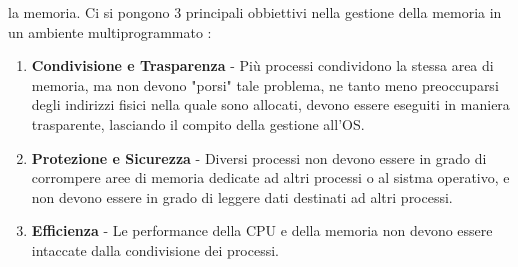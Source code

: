 \documentclass[12pt, letterpaper]{article}
\begin{document}
la memoria. Ci si pongono 3 principali obbiettivi nella gestione della memoria in un ambiente multiprogrammato : \begin{enumerate}
    \item \textbf{Condivisione e Trasparenza} - Più processi condividono la stessa area di memoria, ma non devono 
    "porsi" tale problema, ne tanto meno preoccuparsi degli indirizzi fisici nella quale sono allocati, devono essere eseguiti 
    in maniera trasparente, lasciando il compito della gestione all'OS.
    \item \textbf{Protezione e Sicurezza} - Diversi processi non devono essere in grado di corrompere aree di memoria dedicate 
    ad altri processi o al sistma operativo, e non devono essere in grado di leggere dati destinati ad altri processi.
    \item \textbf{Efficienza} - Le performance della CPU e della memoria non devono essere intaccate dalla condivisione dei processi. 
\end{enumerate}
\end{document}
